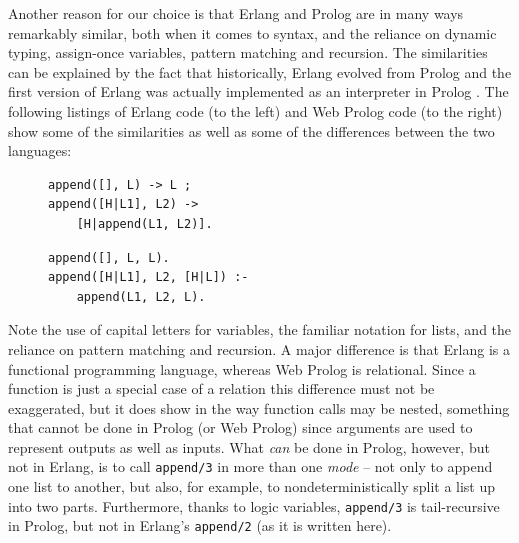 Another reason for our choice is that Erlang and Prolog are in many ways remarkably similar, both when it comes to syntax, and the reliance on dynamic typing, assign-once variables, pattern matching and recursion. The similarities can be explained by the fact that historically, Erlang evolved from Prolog and the first version of Erlang was actually implemented as an interpreter in Prolog \cite{useofprolog:article}. %
The following listings of Erlang code (to the left) and Web Prolog code (to the right) show some of the similarities as well as some of the differences between the two languages:

\begin{figure}[h]
\begin{minipage}{0.485\linewidth}
\begin{tcolorbox}[
  colback=white,
  colframe=black,
  arc=0pt,
  outer arc=0pt,
  boxrule=0.4pt,
  left=2mm,right=2mm,top=1mm,bottom=1mm,
  enhanced
]
\begin{verbatim}
append([], L) -> L ;
append([H|L1], L2) -> 
    [H|append(L1, L2)].                
\end{verbatim}
\end{tcolorbox}
\end{minipage}
\hfill
\begin{minipage}{0.485\linewidth}
\begin{tcolorbox}[
  colback=white,
  colframe=black,
  arc=0pt,
  outer arc=0pt,
  boxrule=0.4pt,
  left=2mm,right=2mm,top=1mm,bottom=1mm,
  enhanced
]
\begin{verbatim}
append([], L, L).           
append([H|L1], L2, [H|L]) :-
    append(L1, L2, L). 
\end{verbatim}
\end{tcolorbox}
\end{minipage}
\end{figure}



\noindent Note the use of capital letters for variables, the familiar notation for lists, and the reliance on pattern matching and recursion. A major difference is that Erlang is a functional programming language, whereas Web Prolog is relational. Since a function is just a special case of a relation this difference must not be exaggerated, but it does show in the way function calls may be nested, something that cannot be done in Prolog (or Web Prolog) since arguments are used to represent outputs as well as inputs. What \textit{can} be done in Prolog, however, but not in Erlang, is to call \texttt{append/3} in more than one \textit{mode} -- not only to append one list to another, but also, for example, to nondeterministically split a list up into two parts. Furthermore, thanks to logic variables, \texttt{append/3} is tail-recursive in Prolog, but not in Erlang's \texttt{append/2} (as it is written here).


